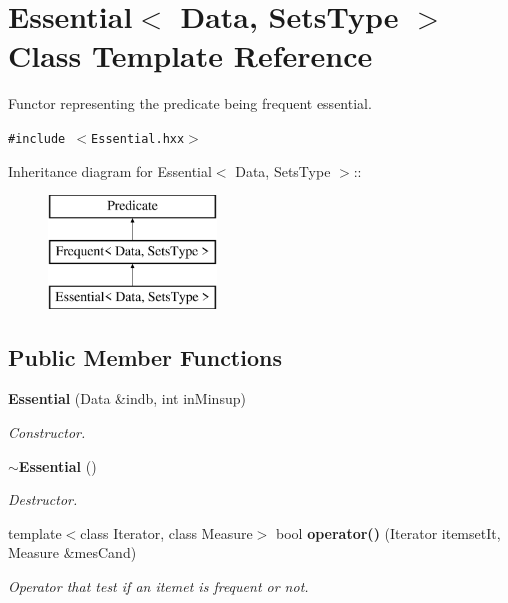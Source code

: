 \section{Essential$<$ Data, Sets\-Type $>$ Class Template Reference}
\label{class_essential}
Functor representing the predicate being frequent essential.  


{\tt \#include $<$Essential.hxx$>$}

Inheritance diagram for Essential$<$ Data, Sets\-Type $>$::\begin{figure}[H]
\begin{center}
\leavevmode
\includegraphics[height=3cm]{class_essential}
\end{center}
\end{figure}
\subsection*{Public Member Functions}
\begin{CompactItemize}
\item 
{\bf Essential} (Data \&indb, int in\-Minsup)
\begin{CompactList}\small\item\em Constructor. \item\end{CompactList}\item 
{\bf $\sim$Essential} ()\label{class_essential_a4f54ab8615df753dffc0a4d64af6c63}

\begin{CompactList}\small\item\em Destructor. \item\end{CompactList}\item 
template$<$class Iterator, class Measure$>$ bool {\bf operator()} (Iterator itemset\-It, Measure \&mes\-Cand)
\begin{CompactList}\small\item\em Operator that test if an itemet is frequent or not. \item\end{CompactList}\end{CompactItemize}


